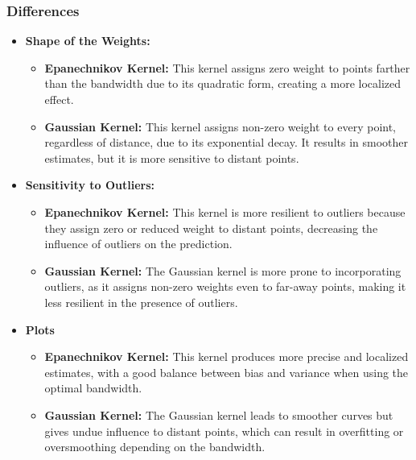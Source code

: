 \subsubsection{Differences}
\begin{itemize}
	\item \textbf{Shape of the Weights:}
	      \begin{itemize}
		      \item \textbf{Epanechnikov Kernel:} This kernel assigns zero weight to points farther than the bandwidth due to its quadratic form, creating a more localized effect.
		      \item \textbf{Gaussian Kernel:} This kernel assigns non-zero weight to every point, regardless of distance, due to its exponential decay. It results in smoother estimates, but it is more sensitive to distant points.
	      \end{itemize}

	\item \textbf{Sensitivity to Outliers:}
	      \begin{itemize}
		      \item \textbf{Epanechnikov Kernel:} This kernel is more resilient to outliers because they assign zero or reduced weight to distant points, decreasing the influence of outliers on the prediction.
		      \item \textbf{Gaussian Kernel:} The Gaussian kernel is more prone to incorporating outliers, as it assigns non-zero weights even to far-away points, making it less resilient in the presence of outliers.
	      \end{itemize}
	\item \textbf{Plots}
	      \begin{itemize}
		      \item \textbf{Epanechnikov Kernel:} This kernel produces more precise and localized estimates, with a good balance between bias and variance when using the optimal bandwidth.
		      \item \textbf{Gaussian Kernel:} The Gaussian kernel leads to smoother curves but gives undue influence to distant points, which can result in overfitting or oversmoothing depending on the bandwidth.
	      \end{itemize}
\end{itemize}





